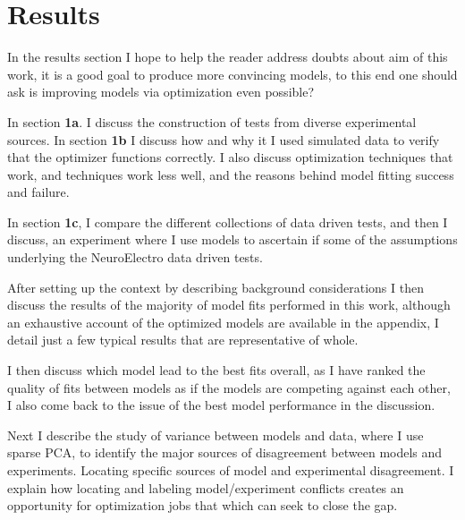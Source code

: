 \chapter{Results}
In the results section I hope to help the reader address doubts about aim of this work, it is a good goal to produce more convincing models, to this end one should ask is improving models via optimization even possible?

In section \textbf{1a}. I discuss the construction of tests from diverse experimental sources. In section \textbf{1b} I discuss how and why it I used simulated data to verify that the optimizer functions correctly. I also discuss optimization techniques that work, and techniques work less well, and the reasons behind model fitting success and failure. 

In section \textbf{1c}, I compare the different collections of data driven tests, and then I discuss, an experiment where I use models to ascertain if some of the assumptions underlying the NeuroElectro data driven tests. 

After setting up the context by describing background considerations I then discuss the results of the majority of model fits performed in this work, although an exhaustive account of the optimized models are available in the appendix, I detail just a few typical results that are representative of whole.

I then discuss which model lead to the best fits overall, as I have ranked the quality of fits between models as if the models are competing against each other, I also come back to the issue of the best model performance in the discussion. %

Next I describe the study of variance between models and data, where I use sparse PCA, to identify the major sources of disagreement between models and experiments. Locating specific sources of model and experimental disagreement. I explain how locating and labeling model/experiment conflicts creates an opportunity for optimization jobs that which can seek to close the gap.



